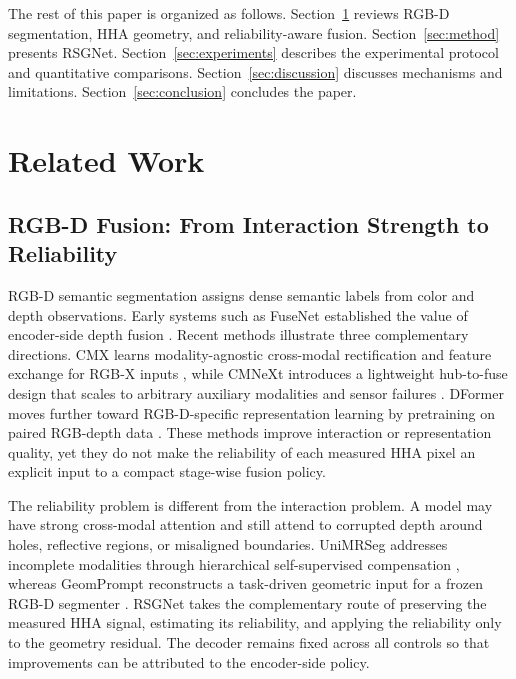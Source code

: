 \documentclass[a4paper,fleqn]{cas-dc}
\begin{document}
The rest of this paper is organized as follows. Section~\ref{sec:related} reviews RGB-D segmentation, HHA geometry, and reliability-aware fusion. Section~\ref{sec:method} presents RSGNet. Section~\ref{sec:experiments} describes the experimental protocol and quantitative comparisons. Section~\ref{sec:discussion} discusses mechanisms and limitations. Section~\ref{sec:conclusion} concludes the paper.

\section{Related Work}\label{sec:related}

\subsection{RGB-D Fusion: From Interaction Strength to Reliability}

RGB-D semantic segmentation assigns dense semantic labels from color and depth observations. Early systems such as FuseNet established the value of encoder-side depth fusion \citep{hazirbas2016fusenet}. Recent methods illustrate three complementary directions. CMX learns modality-agnostic cross-modal rectification and feature exchange for RGB-X inputs \citep{zhang2023cmx}, while CMNeXt introduces a lightweight hub-to-fuse design that scales to arbitrary auxiliary modalities and sensor failures \citep{zhang2023delivering}. DFormer moves further toward RGB-D-specific representation learning by pretraining on paired RGB-depth data \citep{yin2024dformer}. These methods improve interaction or representation quality, yet they do not make the reliability of each measured HHA pixel an explicit input to a compact stage-wise fusion policy.

The reliability problem is different from the interaction problem. A model may have strong cross-modal attention and still attend to corrupted depth around holes, reflective regions, or misaligned boundaries. UniMRSeg addresses incomplete modalities through hierarchical self-supervised compensation \citep{zhao2025unimrseg}, whereas GeomPrompt reconstructs a task-driven geometric input for a frozen RGB-D segmenter \citep{jaganathan2026geomprompt}. RSGNet takes the complementary route of preserving the measured HHA signal, estimating its reliability, and applying the reliability only to the geometry residual. The decoder remains fixed across all controls so that improvements can be attributed to the encoder-side policy.
\end{document}
